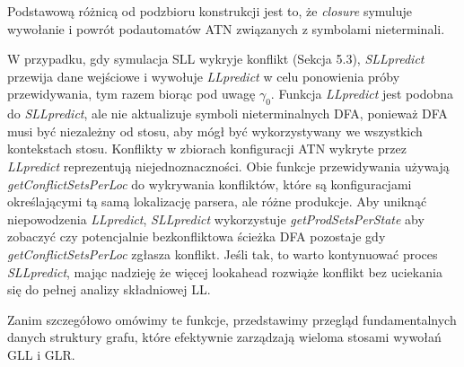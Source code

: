 Podstawową różnicą od podzbioru konstrukcji jest to, że \textit{closure} symuluje wywołanie
i powrót podautomatów ATN związanych z symbolami nieterminali.
\par
W przypadku, gdy symulacja SLL wykryje konflikt (Sekcja 5.3), \textit{SLLpredict} przewija dane wejściowe
i wywołuje \textit{LLpredict} w celu ponowienia próby przewidywania, tym razem biorąc pod uwagę $\gamma_0$.
Funkcja \textit{LLpredict} jest podobna do \textit{SLLpredict}, ale nie aktualizuje symboli nieterminalnych
DFA, ponieważ DFA musi być niezależny od stosu, aby mógł być wykorzystywany we wszystkich kontekstach stosu.
Konflikty w zbiorach konfiguracji ATN wykryte przez \textit{LLpredict} reprezentują niejednoznaczności.
Obie funkcje przewidywania używają \textit{getConflictSetsPerLoc} do wykrywania konfliktów,
które są konfiguracjami określającymi tą samą lokalizację parsera, ale różne produkcje.
Aby uniknąć niepowodzenia \textit{LLpredict}, \textit{SLLpredict} wykorzystuje \textit{getProdSetsPerState}
aby zobaczyć czy potencjalnie bezkonfliktowa ścieżka DFA pozostaje gdy \textit{getConflictSetsPerLoc}
zgłasza konflikt.
Jeśli tak, to warto kontynuować proces \textit{SLLpredict}, mając nadzieję że więcej lookahead
rozwiąże konflikt bez uciekania się do pełnej analizy składniowej LL.
\par
Zanim szczegółowo omówimy te funkcje, przedstawimy przegląd fundamentalnych danych struktury grafu,
które efektywnie zarządzają wieloma stosami wywołań GLL i GLR.
